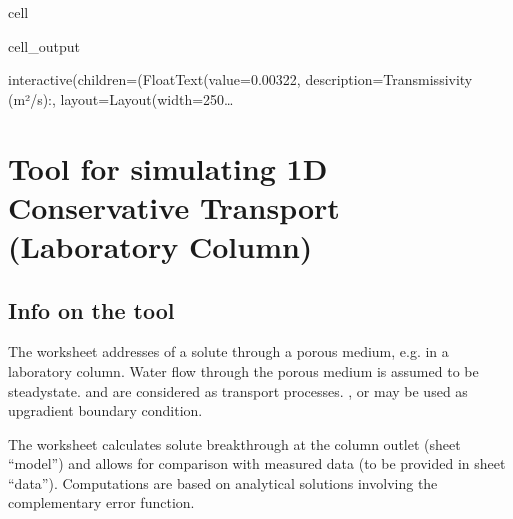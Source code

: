 \documentclass[letterpaper,10pt,english]{jupyterBook}
\begin{document}
\begin{sphinxuseclass}{cell}
\begin{sphinxVerbatimOutput}
\begin{sphinxuseclass}{cell_output}
\begin{sphinxVerbatim}[commandchars=\\\{\}]
interactive(children=(FloatText(value=0.00322, description=\PYGZsq{}Transmissivity  (m²/s):\PYGZsq{}, layout=Layout(width=\PYGZsq{}250…
\end{sphinxVerbatim}

\end{sphinxuseclass}\end{sphinxVerbatimOutput}

\end{sphinxuseclass}
\sphinxstepscope


\chapter{Tool for simulating 1D Conservative Transport (Laboratory Column)}
\label{\detokenize{content/tools/1D_advection_dispersion:tool-for-simulating-1d-conservative-transport-laboratory-column}}\label{\detokenize{content/tools/1D_advection_dispersion::doc}}

\section{Info on the tool}
\label{\detokenize{content/tools/1D_advection_dispersion:info-on-the-tool}}
\sphinxAtStartPar
The worksheet addresses  of a solute through a porous medium, e.g. in a laboratory column. 
Water flow through the porous medium is assumed to be steady\sphinxhyphen{}state. 
 and  are considered as transport processes. 
,  or  may be used as upgradient boundary condition. 

\sphinxAtStartPar
The worksheet calculates solute breakthrough at the column outlet (sheet “model”) and allows for comparison with measured data (to be provided in sheet “data”). 
Computations are based on analytical solutions involving the complementary error function.
\end{document}
